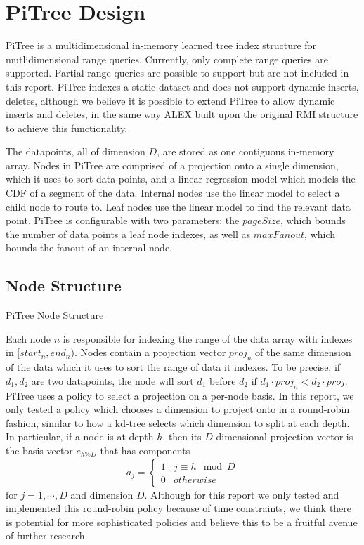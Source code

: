 \documentclass[sigconf,10pt]{acmart}
\begin{document}

\section{PiTree Design}

PiTree is a multidimensional in-memory learned tree index structure for
mutlidimensional range queries. Currently, only complete range queries are supported.
Partial range queries are possible to support but are not included in this report. 
PiTree indexes a static dataset and does not support dynamic inserts, deletes,
although we believe it is possible to extend PiTree to allow dynamic inserts and deletes,
in the same way ALEX built upon the original RMI structure to achieve this functionality. %

The datapoints, all of dimension $D$, are stored as one contiguous in-memory array.
Nodes in PiTree are comprised of a projection onto a single dimension, which it uses to
sort data points, and a linear regression model which models the CDF of a segment of the data.
Internal nodes use the linear model to select a child node to route to.
Leaf nodes use the linear model to find the relevant data point. 
PiTree is configurable with two parameters: the $pageSize$, 
which bounds the number of data points
a leaf node indexes, as well as $maxFanout$, which bounds the fanout
of an internal node.

\subsection{Node Structure}

\begin{algorithm}[t]
  \SetAlgoNoLine\PrintSemicolon
  \caption{PiTree Node Structure}
  \label{PiTreeNode}
\end{algorithm}


Each node $n$ is responsible for indexing the range of the data array with indexes in $[start_n, end_n)$.
Nodes contain a projection vector $proj_n$ of the same dimension of the data
which it uses to sort the range of data it indexes. 
To be precise, if $d_1, d_2$ are two datapoints, the node will 
sort $d_1$ before $d_2$ if $d_1 \cdot proj_n < d_2 \cdot proj$.
PiTree uses a policy to select a projection on a per-node basis. In this report,
we only tested a policy which chooses a dimension to project onto in a round-robin
fashion, similar to how a kd-tree selects which dimension to split at each depth.
In particular, if a node is at depth $h$, then its
$D$ dimensional projection vector is the basis vector $e_{h \% D}$ that has components 
$$a_j = \begin{cases} 
  1 & j \equiv h \mod D \\
  0 & otherwise
\end{cases}
$$
for $j=1, \cdots, D$ and dimension $D$. Although for this report we only 
tested and implemented this round-robin policy because of time constraints,
we think there is potential
for more sophisticated policies and believe this to be a fruitful avenue of further
research.
\end{document}

